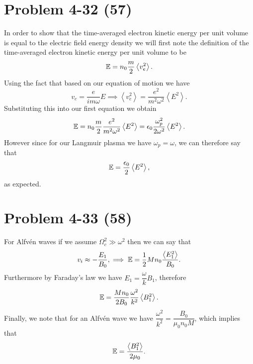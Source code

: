 \section*{Problem 4-32 (57)}
\label{sec:4-32}
In order to show that the time-averaged electron kinetic energy per unit volume is equal to the electric field energy density we will first note the definition of the time-averaged electron kinetic energy per unit volume to be
\begin{equation*}
	\mathbb{E} = n_0\frac{m}{2}\left<v_e^2 \right>.
\end{equation*}
Using the fact that based on our equation of motion we have
\begin{equation*}
	v_e = \dfrac{e}{im\omega}E \implies \left<v_e^2\right> = \dfrac{e^2}{m^2\omega^2}\left<E^2\right>.
\end{equation*}
Substituting this into our first equation we obtain
\begin{equation*}
	\mathbb{E} = n_0\frac{m}{2} \dfrac{e^2}{m^2\omega^2}\left<E^2\right> = \epsilon_0\dfrac{\omega^2_p}{2\omega^2}\left<E^2\right>.
\end{equation*}
However since for our Langmuir plasma we have \(\omega_p = \omega \), we can therefore say that 
\begin{equation*}
	\mathbb{E} = \dfrac{\epsilon_0}{2}\left<E^2\right>,
\end{equation*}
as expected.


\section*{Problem 4-33 (58)}
\label{sec:4-33}
For Alfv\'en waves if we assume \(\Omega^2_c \gg \omega^2 \) then we can say that 
\begin{equation*}
	v_i \approx -\dfrac{E_1}{B_0}, \implies \mathbb{E} = \dfrac{1}{2}Mn_0\dfrac{\left<E_1^2\right>}{B_0}.
\end{equation*}
Furthermore by Faraday's law we have \(E_1 = \dfrac{\omega}{k}B_1 \), therefore
\begin{equation*}
	\mathbb{E} = \dfrac{Mn_0}{2B_0}\dfrac{\omega^2}{k^2}\left<B^2_1 \right>.
\end{equation*}
Finally, we note that for an Alfv\'en wave we have \(\dfrac{\omega^2}{k^2} = \dfrac{B_0}{\mu_0n_0M} \), which implies that
\begin{equation*}
	\mathbb{E} = \dfrac{\left<B_1^2\right>}{2\mu_0}.
\end{equation*}

%

